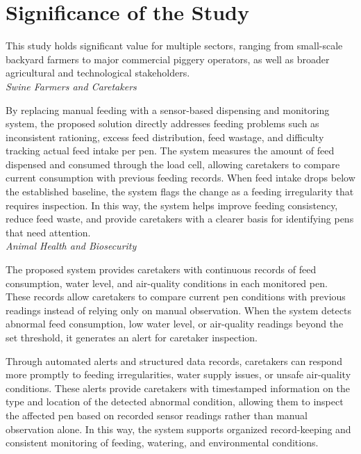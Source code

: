 \section{Significance of the Study}

This study holds significant value for multiple sectors, ranging from small-scale backyard farmers to major commercial piggery operators, as well as broader agricultural and technological stakeholders.\\

\noindent\textit{Swine Farmers and Caretakers}

By replacing manual feeding with a sensor-based dispensing and monitoring system, the proposed solution directly addresses feeding problems such as inconsistent rationing, excess feed distribution, feed wastage, and difficulty tracking actual feed intake per pen. The system measures the amount of feed dispensed and consumed through the load cell, allowing caretakers to compare current consumption with previous feeding records. When feed intake drops below the established baseline, the system flags the change as a feeding irregularity that requires inspection. In this way, the system helps improve feeding consistency, reduce feed waste, and provide caretakers with a clearer basis for identifying pens that need attention.
\\

\noindent\textit{Animal Health and Biosecurity}

The proposed system provides caretakers with continuous records of feed consumption, water level, and air-quality conditions in each monitored pen. These records allow caretakers to compare current pen conditions with previous readings instead of relying only on manual observation. When the system detects abnormal feed consumption, low water level, or air-quality readings beyond the set threshold, it generates an alert for caretaker inspection.

Through automated alerts and structured data records, caretakers can respond more promptly to feeding irregularities, water supply issues, or unsafe air-quality conditions. These alerts provide caretakers with timestamped information on the type and location of the detected abnormal condition, allowing them to inspect the affected pen based on recorded sensor readings rather than manual observation alone. In this way, the system supports organized record-keeping and consistent monitoring of feeding, watering, and environmental conditions.
\\


